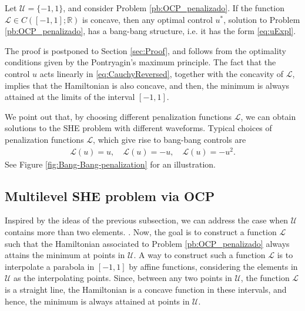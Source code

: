 \documentclass[twocolumn]{autart}    %
\begin{document}
\bigskip

\begin{theorem}\label{th:bang-bang}
Let $\mathcal{U}=\{ -1, 1\}$, and consider Problem \ref{pb:OCP_penalizado}. If the function $\mathcal{L}\in C([-1,1];\mathbb{R})$ is concave, then any optimal control $u^\ast$, solution to Problem \ref{pb:OCP_penalizado}, has a bang-bang structure, i.e. it has the form \eqref{eq:uExpl}.
\end{theorem}

The proof is postponed to Section \ref{sec:Proof}, and follows from the optimality conditions given by the Pontryagin's maximum principle. The fact that the control $u$ acts linearly in \eqref{eq:CauchyReversed}, together with the concavity of $\mathcal{L}$, implies that the Hamiltonian is also concave, and then, the minimum is always attained at the limits of the interval $[-1,1]$.

We point out that, by choosing different penalization functions $\mathcal{L}$, we can obtain solutions to the SHE problem with different waveforms.
Typical choices of penalization functions $\mathcal{L}$, which give rise to bang-bang controls are 
\begin{align*}
	\mathcal{L}(u) = u,  \quad \mathcal{L}(u) = -u,  \quad \mathcal{L}(u) = -u^2.
\end{align*} 
See Figure \ref{fig:Bang-Bang-penalization} for an illustration.

\subsection{Multilevel SHE problem via OCP}

Inspired by the ideas of the previous subsection, we can address the case when $\mathcal{U}$ contains more than two elements. . Now, the goal is to construct a function $\mathcal{L}$ such that the Hamiltonian associated to Problem \ref{pb:OCP_penalizado} always attains the minimum at points in $\mathcal{U}$.
A way to construct such a function $\mathcal{L}$ is to interpolate a parabola in $[-1,1]$ by affine functions, considering the elements in $\mathcal{U}$ as the interpolating points.  Since, between any two points in $\mathcal{U}$,  the function $\mathcal{L}$ is a straight line,  the Hamiltonian is a concave function in these intervals, and hence, the minimum is always attained at points in $\mathcal{U}$.
\end{document}
